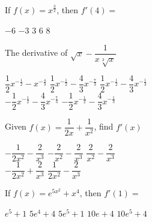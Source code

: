 \begin{questions}
    \question If $f(x) = x^\frac{3}{2}$, then $f'(4) =$ \\
    
    \begin{oneparchoices}
        \choice $-6$ 
        \choice $-3$ 
        \choice $3$
        \choice $6$
        \choice $8$
    \end{oneparchoices} \par \horizontalline

    \question The derivative of $\sqrt x - \dfrac{1}{x\sqrt[3]{x}}$ \\

    \begin{oneparchoices}
        \choice $\dfrac{1}{2}x^{-\frac{1}{2}} - x^{-\frac{4}{3}}$
        \choice $\dfrac{1}{2}x^{-\frac{1}{2}} - \dfrac{4}{3}x^{-\frac{7}{3}}$ 
        \choice $\dfrac{1}{2}x^{-\frac{1}{2}} - \dfrac{4}{3}x^{-\frac{1}{3}}$ \\[11pt]
        \makebox[0.2 \textwidth] \choice $-\dfrac{1}{2}x^{-\frac{1}{2}} - \dfrac{4}{3}x^{-\frac{7}{3}}$ 
        \makebox[0.25 \textwidth] \choice $-\dfrac{1}{2}x^{-\frac{1}{2}} - \dfrac{4}{3}x^{-\frac{1}{3}}$
    \end{oneparchoices} \par \horizontalline

    \question Given $f(x) = \dfrac{1}{2x} + \dfrac{1}{x^2}$, find $f'(x)$ \\

    \begin{oneparchoices}
        \choice $-\dfrac{1}{2x^2} - \dfrac{2}{x^3}$ 
        \choice $-\dfrac{2}{x^2} - \dfrac{2}{x^3}$
        \choice $\dfrac{2}{x^2} - \dfrac{2}{x^3}$ \\
        \makebox[0.23 \textwidth] \choice $-\dfrac{1}{2x^2} + \dfrac{2}{x^3}$
        \makebox[0.29 \textwidth] \choice $\dfrac{1}{2x^2} - \dfrac{2}{x^3}$
    \end{oneparchoices} \par \horizontalline

    \question If $f(x) = e^{5x^2} + x^4$, then $f'(1)=$ \\

    \begin{oneparchoices}
        \choice $e^5 + 1$
        \choice $5e^4 + 4$ 
        \choice $5e^5 + 1$
        \choice $10e + 4$
        \choice $10e^5 + 4$
    \end{oneparchoices} \par \horizontalline


\end{questions}

